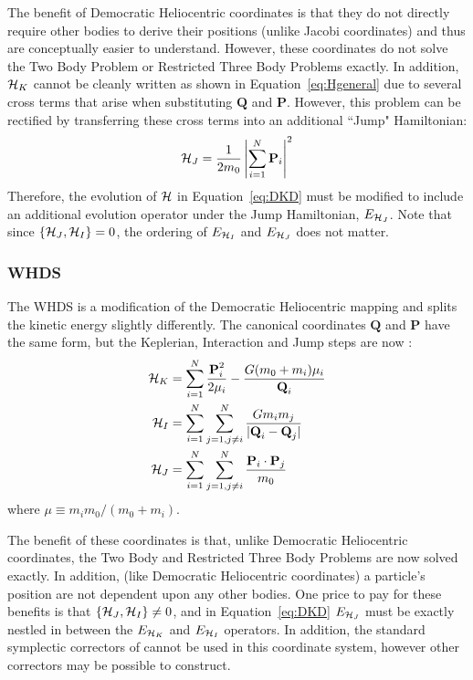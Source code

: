 The benefit of Democratic Heliocentric coordinates is that they do not directly require other bodies to derive their positions (unlike Jacobi coordinates) and thus are conceptually easier to understand. 
However, these coordinates do not solve the Two Body Problem or Restricted Three Body Problems exactly. 
In addition, $\mathcal{H}_K$ cannot be cleanly written as shown in Equation~\ref{eq:Hgeneral} due to several cross terms that arise when substituting $\textbf{Q}$ and \textbf{P}.
However, this problem can be rectified by transferring these cross terms into an additional ``Jump" Hamiltonian:
\begin{equation}
\mathcal{H}_J = \frac{1}{2m_0} \left|\sum_{i=1}^N \textbf{P}_i\right|^2
\end{equation}
Therefore, the evolution of $\mathcal{H}$ in Equation~\ref{eq:DKD} must be modified to include an additional evolution operator under the Jump Hamiltonian, $E_{\mathcal{H}_J}$.
Note that since $\{\mathcal{H}_J, \mathcal{H}_I\} = 0$, the ordering of $E_{\mathcal{H}_I}$ and $E_{\mathcal{H}_J}$ does not matter. 

\subsubsection{WHDS}
The WHDS is a modification of the Democratic Heliocentric mapping and splits the kinetic energy slightly differently. 
The canonical coordinates $\textbf{Q}$ and $\textbf{P}$ have the same form, but the Keplerian, Interaction and Jump steps are now \citep{Laskar1995, Wisdom2006, Hernandez2016}:
\begin{align}
\begin{split}
\mathcal{H}_K &= \sum_{i=1}^N \frac{\textbf{P}_i^2}{2\mu_i} - \frac{G(m_0 + m_i)\mu_i}{\textbf{Q}_i} \\
\mathcal{H}_I &= \sum_{i=1}^{N}\sum_{j=1,j \ne i}^N \frac{Gm_im_j}{|\textbf{Q}_i - \textbf{Q}_j|} \\
\mathcal{H}_J &= \sum_{i=1}^{N}\sum_{j=1,j \ne i}^N \frac{\textbf{P}_i \cdot \textbf{P}_j}{m_0}
\end{split}
\end{align}
where $\mu \equiv m_im_0/(m_0 + m_i)$.

The benefit of these coordinates is that, unlike Democratic Heliocentric coordinates, the Two Body and Restricted Three Body Problems are now solved exactly. 
In addition, (like Democratic Heliocentric coordinates) a particle's position are not dependent upon any other bodies. 
One price to pay for these benefits is that $\{\mathcal{H}_J, \mathcal{H}_I\} \ne 0$, and in Equation~\ref{eq:DKD} $E_{\mathcal{H}_J}$ must be exactly nestled in between the $E_{\mathcal{H}_K}$ and $E_{\mathcal{H}_I}$ operators.
In addition, the standard symplectic correctors of \citet{Wisdom2006} cannot be used in this coordinate system, however other correctors may be possible to construct. 

